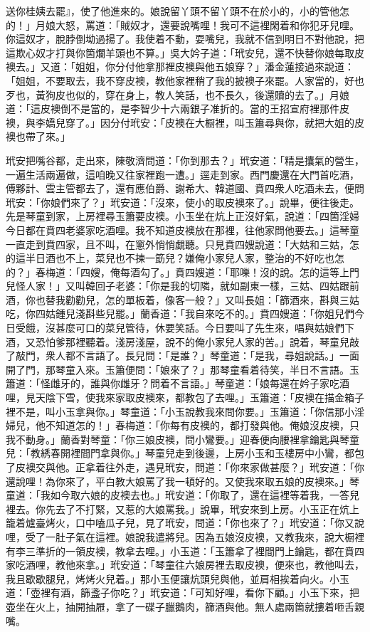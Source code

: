 送你桂姨去罷』，使了他進來的。娘說留丫頭不留丫頭不在於小的，小的管他怎的！」月娘大怒，罵道：「賊奴才，還要說嘴哩！我可不這裡閑着和你犯牙兒哩。你這奴才，脫脖倒坳過揚了。我使着不動，耍嘴兒，我就不信到明日不對他說，把這欺心奴才打與你箇爛羊頭也不算。」吳大妗子道：「玳安兒，還不快替你娘每取皮襖去。」又道：「姐姐，你分付他拿那裡皮襖與他五娘穿？」潘金蓮接過來說道：「姐姐，不要取去，我不穿皮襖，教他家裡稍了我的披襖子來罷。人家當的，好也歹也，黃狗皮也似的，{}穿在身上，教人笑話，也不長久，後還贖的去了。」{}月娘道：「這皮襖倒不是當的，是李智少十六兩銀子准折的。當的王招宣府裡那件皮襖，與李嬌兒穿了。」因分付玳安：「皮襖在大橱裡，叫玉簫尋與你，就把大姐的皮襖也帶了來。」

玳安把嘴谷都，走出來，陳敬濟問道：「你到那去？」玳安道：「精是攮氣的營生，一遍生活兩遍做，這咱晚又往家裡跑一遭。」逕走到家。西門慶還在大門首吃酒，傅夥計、雲主管都去了，還有應伯爵、謝希大、韓道國、賁四衆人吃酒未去，便問玳安：「你娘們來了？」玳安道：「沒來，使小的取皮襖來了。」說畢，便往後走。先是琴童到家，上房裡尋玉簫要皮襖。小玉坐在炕上正沒好氣，說道：「四箇淫婦今日都在賁四老婆家吃酒哩。我不知道皮襖放在那裡，往他家問他要去。」這琴童一直走到賁四家，且不叫，在窻外悄悄覷聽。只見賁四嫂說道：「大姑和三姑，怎的這半日酒也不上，菜兒也不揀一筯兒？嫌俺小家兒人家，整治的不好吃也怎的？」春梅道：「四嫂，俺每酒勾了。」賁四嫂道：「耶嚛！沒的說。怎的這等上門兒怪人家！」又叫韓回子老婆：「你是我的切隣，就如副東一樣，三姑、四姑跟前酒，你也替我勸勸兒，怎的單板着，像客一般？」又叫長姐：「篩酒來，斟與三姑吃，你四姑鍾兒淺斟些兒罷。」蘭香道：「我自來吃不的。」賁四嫂道：「你姐兒們今日受餓，沒甚麼可口的菜兒管待，休要笑話。今日要叫了先生來，唱與姑娘們下酒，又恐怕爹那裡聽着。淺房淺屋，說不的俺小家兒人家的苦。」說着，琴童兒敲了敲門，衆人都不言語了。長兒問：「是誰？」琴童道：「是我，尋姐說話。」一面開了門，那琴童入來。玉簫便問：「娘來了？」那琴童看着待笑，半日不言語。玉簫道：「怪雌牙的，誰與你雌牙？問着不言語。」琴童道：「娘每還在妗子家吃酒哩，見天陰下雪，使我來家取皮襖來，都教包了去哩。」玉簫道：「皮襖在描金箱子裡不是，叫小玉拿與你。」琴童道：「小玉說教我來問你要。」玉簫道：「你信那小淫婦兒，他不知道怎的！」春梅道：「你每有皮襖的，都打發與他。俺娘沒皮襖，只我不動身。」蘭香對琴童：「你三娘皮襖，問小鸞要。」迎春便向腰裡拿鑰匙與琴童兒：「教綉春開裡間門拿與你。」琴童兒走到後邊，上房小玉和玉樓房中小鸞，都包了皮襖交與他。正拿着往外走，遇見玳安，問道：「你來家做甚麼？」玳安道：「你還說哩！為你來了，平白教大娘罵了我一頓好的。又使我來取五娘的皮襖來。」琴童道：「我如今取六娘的皮襖去也。」玳安道：「你取了，還在這裡等着我，一答兒裡去。你先去了不打緊，又惹的大娘罵我。」說畢，玳安來到上房。小玉正在炕上籠着爐臺烤火，口中嗑瓜子兒，見了玳安，問道：「你也來了？」玳安道：「你又說哩，受了一肚子氣在這裡。娘說我遣將兒。因為五娘沒皮襖，又教我來，說大橱裡有李三準折的一領皮襖，教拿去哩。」小玉道：「玉簫拿了裡間門上鑰匙，都在賁四家吃酒哩，教他來拿。」玳安道：「琴童往六娘房裡去取皮襖，便來也，教他叫去，我且歇歇腿兒，烤烤火兒着。」那小玉便讓炕頭兒與他，並肩相挨着向火。小玉道：「壺裡有酒，篩盞子你吃？」玳安道：「可知好哩，看你下顧。」小玉下來，把壺坐在火上，抽開抽屜，拿了一碟子臘鵝肉，篩酒與他。無人處兩箇就摟着咂舌親嘴。

